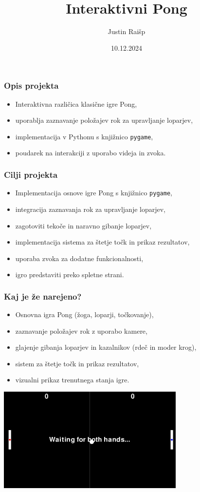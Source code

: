\documentclass{beamer}
\title{Interaktivni Pong}
\author{Justin Raišp}
\date{10.12.2024}
\begin{document}
\frame{\titlepage}

\begin{frame}
\frametitle{Opis projekta}
\begin{itemize}
    \item Interaktivna različica klasične igre Pong,
    \item uporablja zaznavanje položajev rok za upravljanje loparjev,
    \item implementacija v Pythonu s knjižnico \texttt{pygame},
    \item poudarek na interakciji z uporabo videja in zvoka.
\end{itemize}
\end{frame}

\begin{frame}
\frametitle{Cilji projekta}
\begin{itemize}
    \item Implementacija osnove igre Pong s knjižnico \texttt{pygame},
    \item integracija zaznavanja rok za upravljanje loparjev,
    \item zagotoviti tekoče in naravno gibanje loparjev,
    \item implementacija sistema za štetje točk in prikaz rezultatov,
    \item uporaba zvoka za dodatne funkcionalnosti,
    \item igro predstaviti preko spletne strani.
\end{itemize}
\end{frame}

\begin{frame}
\frametitle{Kaj je že narejeno?}
\begin{itemize}
    \item Osnovna igra Pong (žoga, loparji, točkovanje),
    \item zaznavanje položajev rok z uporabo kamere,
    \item glajenje gibanja loparjev in kazalnikov (rdeč in moder krog),
    \item sistem za štetje točk in prikaz rezultatov,
    \item vizualni prikaz trenutnega stanja igre.
\end{itemize}
\vspace{5mm}
\centering
\includegraphics[width=0.7\textwidth]{prototip.png}
\end{frame}
\end{document}
